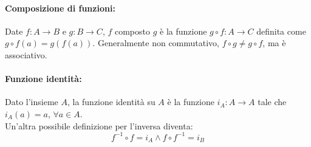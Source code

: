 \paragraph{Composizione di funzioni:} Date $f: A \rightarrow B$ e $g: B \rightarrow C$, $f$ composto $g$ è la funzione $g \circ f: A \rightarrow C$ definita come $g \circ f(a) = g(f(a))$. Generalmente non commutativo, $f \circ g \neq g \circ f$, ma è associativo.\\

\paragraph{Funzione identità:} Dato l'insieme $A$, la funzione identità su $A$ è la funzione $i_A: A \rightarrow A$ tale che $i_A (a) = a$, $\forall a \in A$.\\

Un'altra possibile definizione per l'inversa diventa:
$$ f^{-1} \circ f = i_A \wedge f \circ f^{-1} = i_B $$

